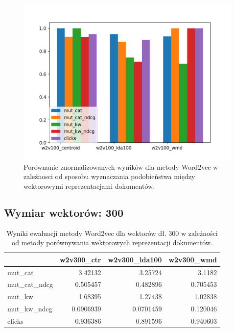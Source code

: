 \documentclass[pl]{minipw} %
\begin{document}
\begin{figure}[H]
	\centering
	\includegraphics[width=1\textwidth]{img/results/w2v100_centroid_w2v100_lda100_w2v100_wmd_.png}
	\caption{Porównanie znormalizowanych wyników dla metody Word2vec w zależnosci od sposobu wyznaczania podobieństwa między wektorowymi reprezentacjami dokumentów.}
\end{figure}

\subsection{Wymiar wektorów: 300}


\begin{table}[H]
	\centering
	\begin{tabular}{lrrr}
		\hline
		&   w2v300\_ctr &   w2v300\_lda100 &   w2v300\_wmd \\
		\hline
		mut\_cat      &    3.42132   &       3.25724   &     3.1182   \\
		mut\_cat\_ndcg &    0.505457  &       0.482896  &     0.705453 \\
		mut\_kw       &    1.68395   &       1.27438   &     1.02838  \\
		mut\_kw\_ndcg  &    0.0906939 &       0.0701459 &     0.120046 \\
		clicks       &    0.936386  &       0.891596  &     0.940603 \\
		\hline
	\end{tabular}
	\caption{Wyniki ewaluacji metody Word2vec dla wektorów dł. 300 w zależności od metody porównywania wektorowych reprezentacji dokumentów.}
\end{table}
\end{document}
